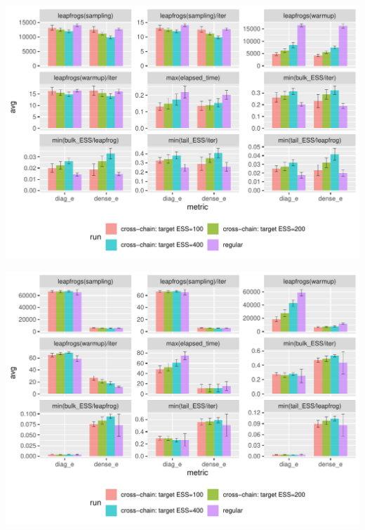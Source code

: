 \documentclass[landscape,a0paper,fontscale=0.45]{baposter} %
\newenvironment{ColFigure}
  {\par\medskip\noindent\minipage{\linewidth}}
  {\endminipage\par\medskip}
\begin{document}
\begin{poster}
{\begin{multicols}{2}
\begin{ColFigure}
\centering
\includegraphics[width=0.95\linewidth]{./figure/cross_chain_ess_effect_sblrc-blr.pdf}
\end{ColFigure}

\begin{ColFigure}
\centering
\includegraphics[width=0.95\linewidth]{./figure/cross_chain_ess_effect_sir.pdf}
\end{ColFigure}





\end{multicols}}
\end{poster}
\end{document}
